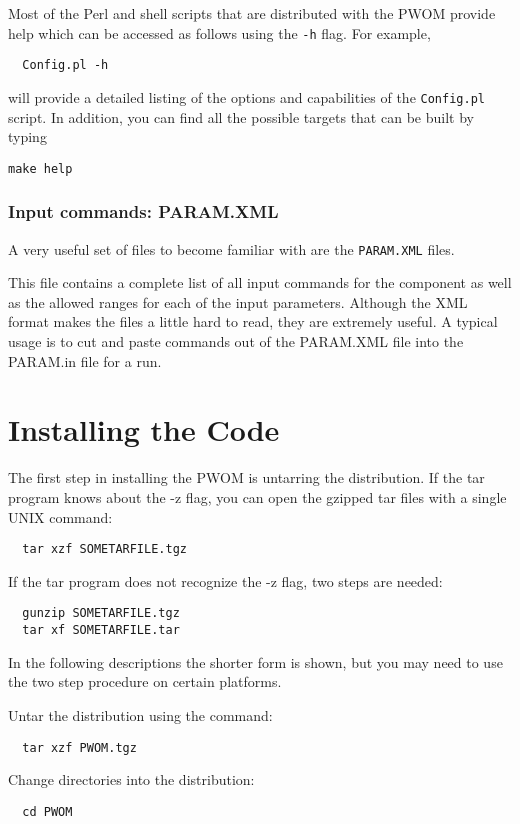 Most of the Perl and shell scripts that are distributed with the PWOM
provide help which can be accessed as follows using the {\tt -h} flag.
For example, 
\begin{verbatim}
  Config.pl -h
\end{verbatim}
will provide a detailed listing of the options and capabilities of the
{\tt Config.pl} script.  In addition, you can find all the possible
targets  that can be built by typing
\begin{verbatim}
make help
\end{verbatim}

\subsubsection{Input commands: PARAM.XML}
A very useful set of files to become familiar with are the {\tt PARAM.XML}
files.

This file contains a complete list of all input commands for the
component as well as the allowed ranges for each of the input parameters.
Although the XML format makes the files a little hard to read, they are
extremely useful.  A typical usage is to cut and paste commands out of the
PARAM.XML file into the PARAM.in file for a run.


\section{Installing the Code}

The first step in installing the PWOM is untarring the distribution.
If the tar program knows about the -z flag, you can open the gzipped
tar files with a single UNIX command:
\begin{verbatim}
  tar xzf SOMETARFILE.tgz
\end{verbatim}
If the tar program does not recognize the -z flag, two steps are needed:
\begin{verbatim}
  gunzip SOMETARFILE.tgz
  tar xf SOMETARFILE.tar
\end{verbatim}
In the following descriptions the shorter form is shown, but you may
need to use the two step procedure on certain platforms.

Untar the distribution using the command:
\begin{verbatim}
  tar xzf PWOM.tgz
\end{verbatim}

Change directories into the distribution:
\begin{verbatim}
  cd PWOM
\end{verbatim}

